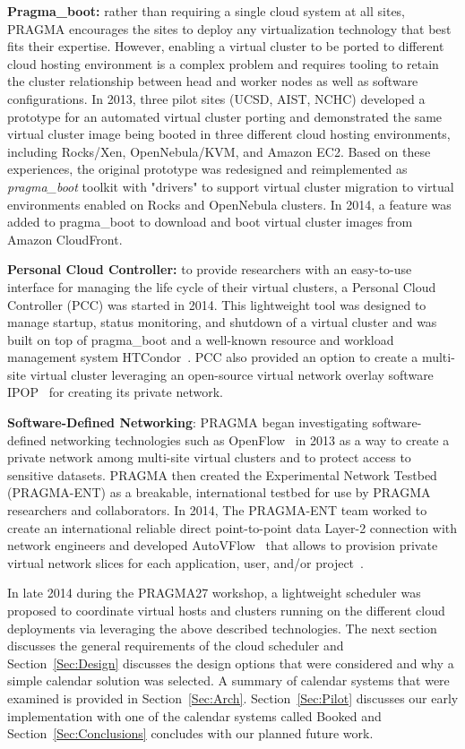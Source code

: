 \documentclass{acm_proc_article-sp}
\begin{document}
\textbf{Pragma\_boot:}  rather than requiring a single cloud system at all sites, PRAGMA encourages the sites to  deploy any virtualization technology that best fits their expertise. However, enabling a virtual cluster to be ported to different cloud hosting environment is a complex problem and requires tooling to retain the cluster relationship between head and worker nodes as well as software configurations.  In 2013, three pilot sites (UCSD, AIST, NCHC) developed a prototype for an automated virtual cluster porting and demonstrated the same virtual cluster image being booted in three different cloud hosting environments, including Rocks/Xen, OpenNebula/KVM, and Amazon EC2.  Based on these experiences, the original prototype was redesigned and reimplemented as \textit{pragma\_boot} toolkit with "drivers" to support  virtual cluster migration to virtual environments enabled on Rocks and OpenNebula clusters.  In 2014, a feature was added to pragma\_boot to download and boot virtual cluster images from Amazon CloudFront.

\textbf{Personal Cloud Controller:}  to provide researchers with an easy-to-use interface for managing the life cycle of their virtual clusters, a Personal Cloud Controller (PCC)  was started in 2014. This lightweight tool was designed to manage startup, status monitoring, and shutdown of a virtual cluster and was built on top of pragma\_boot and a well-known resource and workload management system HTCondor~\cite{condor}.   PCC also provided an option to create a multi-site virtual cluster leveraging an open-source virtual network overlay software IPOP~\cite{ipop} for creating its private network.  

\textbf{Software-Defined Networking}:   PRAGMA began investigating software-defined networking technologies such as OpenFlow~\cite{openflow} in 2013 as a way to create a private network among multi-site virtual clusters and to protect access to sensitive datasets.  PRAGMA then created the Experimental Network Testbed (PRAGMA-ENT) as a breakable, international testbed for use by PRAGMA researchers and collaborators.  In 2014, The PRAGMA-ENT team worked to create an international reliable direct point-to-point data Layer-2 connection with network engineers and developed AutoVFlow~\cite{autovflow} that allows to provision private virtual network slices for each application, user, and/or project~\cite{pragmaReport2014}.  

In late 2014 during the PRAGMA27 workshop, a lightweight scheduler was proposed to coordinate virtual hosts and clusters running on the different cloud deployments via leveraging the above described technologies.  The next section discusses the general requirements of the cloud scheduler and Section~\ref{Sec:Design} discusses the design options that were considered and why a simple calendar solution was selected.  A summary of calendar systems that were examined is provided in Section~\ref{Sec:Arch}.  Section~\ref{Sec:Pilot} discusses our early implementation with one of the calendar systems called Booked and Section~\ref{Sec:Conclusions} concludes with our planned future work.  
\end{document}
